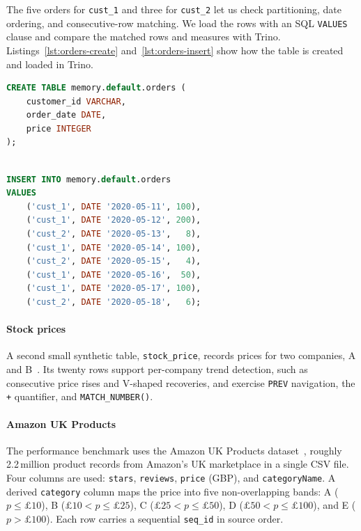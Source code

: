 \documentclass[preprint,12pt,times,a4paper]{elsarticle}
\begin{document}
The five orders for \texttt{cust\_1} and three for \texttt{cust\_2} let us
check partitioning, date ordering, and consecutive-row matching. We load the
rows with an SQL \texttt{VALUES} clause and compare the matched rows and
measures with Trino. Listings~\ref{lst:orders-create} and~\ref{lst:orders-insert}
show how the table is created and loaded in Trino.

\begin{lstlisting}[language=SQL,basicstyle=\ttfamily\small, backgroundcolor=\color{gray!10} ,caption={Creating the in-memory table in Trino },label={lst:orders-create}]
CREATE TABLE memory.default.orders (
    customer_id VARCHAR,
    order_date DATE,
    price INTEGER
);

\end{lstlisting}


\begin{lstlisting}[language=SQL,basicstyle=\ttfamily\small, backgroundcolor=\color{gray!10},caption={Inserting data into the table },label={lst:orders-insert}]

INSERT INTO memory.default.orders
VALUES
    ('cust_1', DATE '2020-05-11', 100),
    ('cust_1', DATE '2020-05-12', 200),
    ('cust_2', DATE '2020-05-13',   8),
    ('cust_1', DATE '2020-05-14', 100),
    ('cust_2', DATE '2020-05-15',   4),
    ('cust_1', DATE '2020-05-16',  50),
    ('cust_1', DATE '2020-05-17', 100),
    ('cust_2', DATE '2020-05-18',   6);

\end{lstlisting}



\paragraph{Stock prices}
A second small synthetic table, \texttt{stock\_price}, records prices for
two companies, A and B~\cite{petkovic2022rpr}. Its
twenty rows support per-company trend detection, such as consecutive price rises
and V-shaped recoveries, and exercise \texttt{PREV} navigation, the \texttt{+}
quantifier, and \texttt{MATCH\_NUMBER()}.

\paragraph{Amazon UK Products}
The performance benchmark uses the Amazon UK Products
dataset~\cite{asaniczka2023amazon}, roughly 2.2\,million product records from
Amazon's UK marketplace in a single CSV file. Four columns are used:
\texttt{stars}, \texttt{reviews}, \texttt{price} (GBP), and
\texttt{categoryName}. A derived \texttt{category} column maps the price into
five non-overlapping bands: A ($p\le\pounds10$),
B ($\pounds10<p\le\pounds25$), C ($\pounds25<p\le\pounds50$),
D ($\pounds50<p\le\pounds100$), and E ($p>\pounds100$). Each row carries a sequential
\texttt{seq\_id} in source order.
\end{document}
